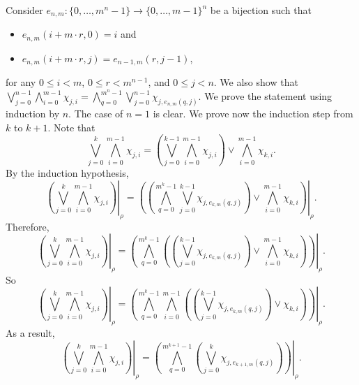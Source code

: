 \documentclass[addpoints]{exam}
\begin{document}
\begin{questions}
\begin{parts}
\begin{solution}[\stretch{1}]
Consider $e_{n, m} : \{0, \dots, m^n - 1\} \to \{0, \dots, m - 1\}^n$ be a bijection
such that
\begin{itemize}
  \item $e_{n, m}(i + m \cdot r, 0) = i$ and
  \item $e_{n, m}(i + m \cdot r, j) = e_{n - 1, m}(r, j - 1)$,
\end{itemize}
for any $0 \le i < m$, $0 \le r < m^{n - 1}$, and $0 \le j < n$.
We also show that
$\bigvee_{j = 0}^{n - 1} \bigwedge_{i = 0}^{m - 1} \chi_{j, i} =
\bigwedge_{q = 0}^{m^n - 1} \bigvee_{j = 0}^{n - 1} \chi_{j, e_{n, m}(q, j)}$.
We prove the statement using induction by $n$. The case of $n = 1$ is clear.
We prove now the induction step from $k$ to $k + 1$.
Note that
\[
  \bigvee_{j = 0}^k \bigwedge_{i = 0}^{m - 1} \chi_{j, i} =
  \left(\bigvee_{j = 0}^{k - 1} \bigwedge_{i = 0}^{m - 1} \chi_{j, i}\right)
  \lor \bigwedge_{i = 0}^{m - 1} \chi_{k, i}.
\]
By the induction hypothesis,
\[
  \left.\left(
    \bigvee_{j = 0}^k \bigwedge_{i = 0}^{m - 1} \chi_{j, i}
  \right)\right\rvert_\rho =
  \left.\left(
    \left(
      \bigwedge_{q = 0}^{m^k - 1} \bigvee_{j = 0}^{k - 1}
        \chi_{j, e_{k, m}(q, j)}
    \right) \lor
    \bigwedge_{i = 0}^{m - 1} \chi_{k, i}
  \right)\right\rvert_\rho.
\]
Therefore,
\[
  \left.\left(
    \bigvee_{j = 0}^k \bigwedge_{i = 0}^{m - 1} \chi_{j, i}
  \right)\right\rvert_\rho =
  \left.\left(
      \bigwedge_{q = 0}^{m^k - 1}
        \left(
          \left(
            \bigvee_{j = 0}^{k - 1}
              \chi_{j, e_{k, m}(q, j)}
          \right) \lor
          \bigwedge_{i = 0}^{m - 1} \chi_{k, i}
        \right)
  \right)\right\rvert_\rho.
\]
So
\[
  \left.\left(
    \bigvee_{j = 0}^k \bigwedge_{i = 0}^{m - 1} \chi_{j, i}
  \right)\right\rvert_\rho =
  \left.\left(
      \bigwedge_{q = 0}^{m^k - 1}
      \bigwedge_{i = 0}^{m - 1}
        \left(
          \left(
            \bigvee_{j = 0}^{k - 1}
              \chi_{j, e_{k, m}(q, j)}
          \right)
          \lor
          \chi_{k, i}
        \right)
  \right)\right\rvert_\rho.
\]
As a result,
\[
  \left.\left(
    \bigvee_{j = 0}^k \bigwedge_{i = 0}^{m - 1} \chi_{j, i}
  \right)\right\rvert_\rho =
  \left.\left(
      \bigwedge_{q = 0}^{m^{k + 1} - 1}
        \left(
          \bigvee_{j = 0}^k
            \chi_{j, e_{k + 1, m}(q, j)}
        \right)
  \right)\right\rvert_\rho.
\]


\end{solution}
\end{parts}
\end{questions}
\end{document}
